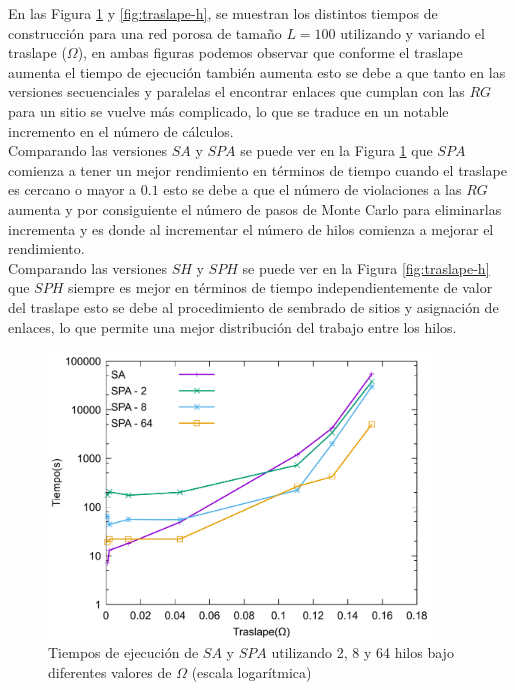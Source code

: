 En las Figura \ref{fig:traslape-a} y \ref{fig:traslape-h}, se muestran los distintos tiempos de construcción para una red porosa de tamaño $L=100$ utilizando y variando el traslape ($\Omega$), en ambas figuras podemos observar que conforme el traslape aumenta el tiempo de ejecución también aumenta esto se debe a que tanto en las versiones secuenciales y paralelas el encontrar enlaces que cumplan con las $RG$ para un sitio se vuelve más complicado, lo que se traduce en un notable incremento en el número de cálculos.\\

Comparando las versiones $SA$ y $SPA$ se puede ver en la Figura \ref{fig:traslape-a} que $SPA$ comienza a tener un mejor rendimiento en términos de tiempo cuando el traslape es cercano o mayor a $0.1$ esto se debe a que el número de violaciones a las $RG$ aumenta y por consiguiente el número de pasos de Monte Carlo para eliminarlas incrementa y es donde al incrementar el número de hilos comienza a mejorar el rendimiento.\\

Comparando las versiones $SH$ y $SPH$ se puede ver en la Figura \ref{fig:traslape-h} que $SPH$ siempre es mejor en términos de tiempo independientemente de valor del traslape esto se debe al procedimiento de sembrado de sitios y asignación de enlaces, lo que permite una mejor distribución del trabajo entre los hilos.

\begin{figure}[hbtp]
\centering
\includegraphics[width=4in]{graphs/traslape_mrg}
\caption{Tiempos de ejecución de $SA$ y $SPA$ utilizando 2, 8 y 64 hilos bajo diferentes valores de $\Omega$ (escala logarítmica)}
\label{fig:traslape-a}
\end{figure}

